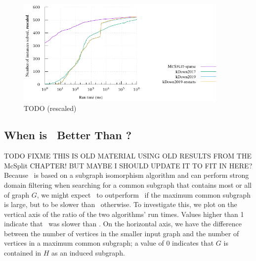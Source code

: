 \begin{figure}[htb]
    \centering
    \includegraphics*[width=0.92\textwidth]{14b-mcsplit-induced-si/sip-instances-mcis-experiment/experiment/plots/cumulative-rescaled.pdf}
    \caption{TODO (rescaled)}
    \label{figure:mcsplit-sparse-cumulative-rescaled}
\end{figure}

\subsection{When is \kDown\ Better Than \McSplitDown?}

TODO FIXME THIS IS OLD MATERIAL USING OLD RESULTS FROM THE McSplit CHAPTER! BUT
MAYBE I SHOULD UPDATE IT TO FIT IN HERE?
Because \kDown\ is based on a subgraph isomorphism algorithm and can perform strong
domain filtering when searching for a common subgraph that contains most or
all of graph $G$, we might expect \kDown\ to outperform \McSplitDown\ if the maximum
common subgraph is large, but to be slower than \McSplitDown\ otherwise.
To investigate this, we plot on the vertical axis of  the ratio of the two
algorithms' run times.  Values higher than 1 indicate that \kDown\ was slower than
\McSplitDown.  On the horizontal axis, we have the difference between the number of
vertices in the smaller input graph and the number of vertices in a maximum
common subgraph; a value of 0 indicates that $G$ is contained in $H$ as an induced subgraph.

